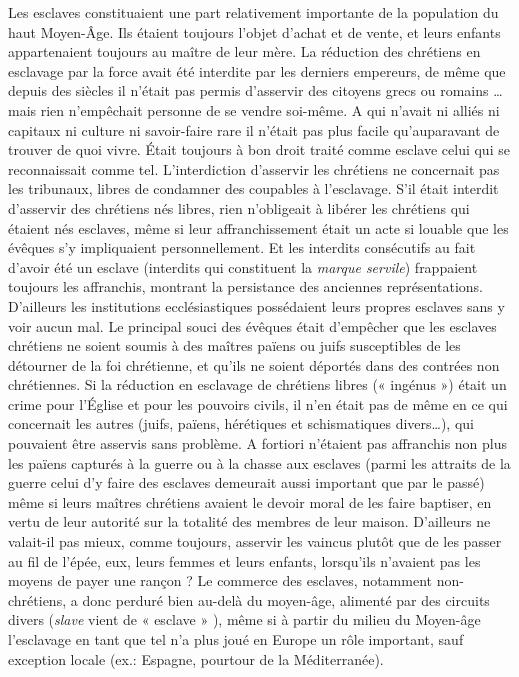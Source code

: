  Les esclaves constituaient une part relativement importante de la population du haut Moyen-Âge. Ils étaient toujours l'objet d'achat et de vente, et leurs enfants appartenaient toujours au maître de leur mère. La réduction des chrétiens en esclavage par la force avait été interdite par les derniers empereurs, de même que depuis des siècles il n'était pas permis d'asservir des citoyens grecs ou romains …mais rien n'empêchait personne de se vendre soi-même. A qui n'avait ni alliés ni capitaux ni culture ni savoir-faire rare il n'était pas plus facile qu'auparavant de trouver de quoi vivre. Était toujours à bon droit traité comme esclave celui qui se reconnaissait comme tel. L'interdiction d'asservir les chrétiens ne concernait pas les tribunaux, libres de condamner des coupables à l'esclavage. S'il était interdit d'asservir des chrétiens nés libres, rien n'obligeait à libérer les chrétiens qui étaient nés esclaves, même si leur affranchissement était un acte si louable que les évêques s'y impliquaient personnellement. Et les interdits consécutifs au fait d'avoir été un esclave (interdits qui constituent la \emph{marque servile}) frappaient toujours les affranchis, montrant la persistance des anciennes représentations. D'ailleurs les institutions ecclésiastiques possédaient leurs propres esclaves sans y voir aucun mal. Le principal souci des évêques était d'empêcher que les esclaves chrétiens ne soient soumis à des maîtres païens ou juifs susceptibles de les détourner de la foi chrétienne, et qu'ils ne soient déportés dans des contrées non chrétiennes. 
 Si la réduction en esclavage de chrétiens libres (« ingénus ») était un crime pour l'Église et pour les pouvoirs civils, il n'en était pas de même en ce qui concernait les autres (juifs, païens, hérétiques et schismatiques divers…), qui pouvaient être asservis sans problème. A fortiori n'étaient pas affranchis non plus les païens capturés à la guerre ou à la chasse aux esclaves (parmi les attraits de la guerre celui d'y faire des esclaves demeurait aussi important que par le passé) même si leurs maîtres chrétiens avaient le devoir moral de les faire baptiser, en vertu de leur autorité sur la totalité des membres de leur maison. D'ailleurs ne valait-il pas mieux, comme toujours, asservir les vaincus plutôt que de les passer au fil de l'épée, eux, leurs femmes et leurs enfants, lorsqu'ils n'avaient pas les moyens de payer une rançon ?
 Le commerce des esclaves, notamment non-chrétiens, a donc perduré bien au-delà du moyen-âge, alimenté par des circuits divers (\emph{slave} vient de « esclave » ), même si à partir du milieu du Moyen-âge l'esclavage en tant que tel n'a plus joué en Europe un rôle important, sauf exception locale (ex.: Espagne, pourtour de la Méditerranée). 
